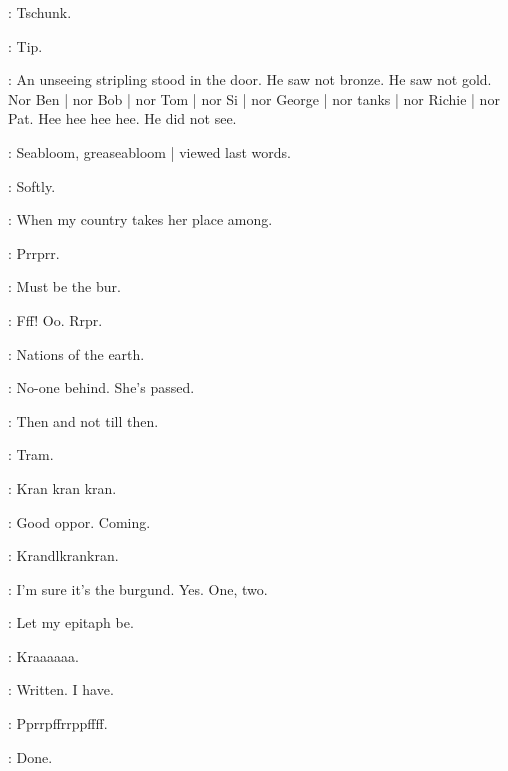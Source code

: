 :
Tschunk.

\stripling:
Tip.

:
An unseeing stripling stood in the door.
He saw not bronze.
He saw not gold.
Nor Ben |
nor Bob |
nor Tom |
nor Si |
nor George |
nor tanks |
nor Richie |
nor Pat.
Hee hee hee hee.
He did not see.

:
Seabloom,
greaseabloom |
viewed last words.

\BloomInt:
Softly.

\emmet:
When my country takes her place among.

:
Prrprr.

\BloomInt:
Must be the bur.

:
Fff!
Oo.
Rrpr.

\emmet:
Nations of the earth.

\BloomInt:
No-one behind.
She's passed.

\emmet:
Then and not till then.

\BloomInt:
Tram.

:
Kran kran kran.

\BloomInt:
Good oppor.
Coming.

:
Krandlkrankran.

\BloomInt:
I'm sure it's the burgund.
Yes.
One,
two.

\emmet:
Let my epitaph be.

:
Kraaaaaa.

\emmet:
Written.
I have.

:
Pprrpffrrppffff.

\emmet:
Done.

